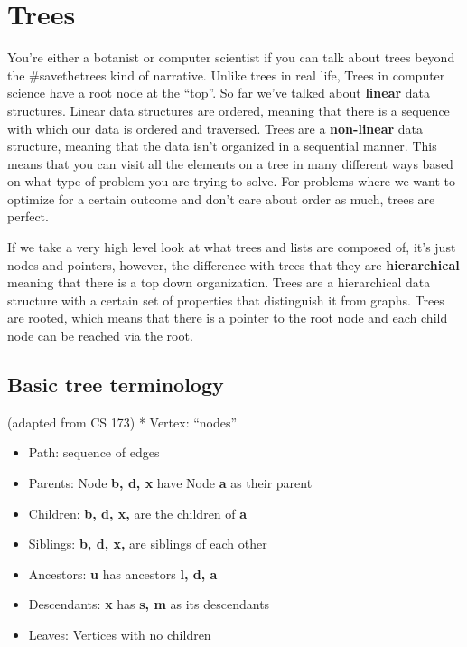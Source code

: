 \documentclass[
]{book}
\begin{document}
\hypertarget{trees}{%
\chapter{Trees}\label{trees}}

You're either a botanist or computer scientist if you can talk about trees beyond the \#savethetrees kind of narrative. Unlike trees in real life, Trees in computer science have a root node at the ``top''. So far we've talked about \textbf{linear} data structures. Linear data structures are ordered, meaning that there is a sequence with which our data is ordered and traversed. Trees are a \textbf{non-linear} data structure, meaning that the data isn't organized in a sequential manner. This means that you can visit all the elements on a tree in many different ways based on what type of problem you are trying to solve. For problems where we want to optimize for a certain outcome and don't care about order as much, trees are perfect.

If we take a very high level look at what trees and lists are composed of, it's just nodes and pointers, however, the difference with trees that they are \textbf{hierarchical} meaning that there is a top down organization.
Trees are a hierarchical data structure with a certain set of properties that distinguish it from graphs. Trees are rooted, which means that there is a pointer to the root node and each child node can be reached via the root.

\hypertarget{basic-tree-terminology}{%
\section{Basic tree terminology}\label{basic-tree-terminology}}

(adapted from CS 173)
* Vertex: ``nodes''

\begin{itemize}
\item
  Path: sequence of edges
\item
  Parents: Node \textbf{b, d, x} have Node \textbf{a} as their parent
\item
  Children: \textbf{b, d, x,} are the children of \textbf{a}
\item
  Siblings: \textbf{b, d, x,} are siblings of each other
\item
  Ancestors: \textbf{u} has ancestors \textbf{l, d, a}
\item
  Descendants: \textbf{x} has \textbf{s, m} as its descendants
\item
  Leaves: Vertices with no children
\end{itemize}
\end{document}
